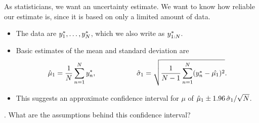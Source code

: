 \begin{frame}

As statisticians, we want an uncertainty estimate. We want to know how reliable our estimate is, since it is based on only a limited amount of data.

\begin{itemize}

\item The data are $y_1^*,\dots,y_N^*$, which we also write as $y_{1:N}^*$.

\item Basic estimates of the mean and standard deviation are 
\begin{equation}
\hat\mu_1= \frac{1}{N}\sum_{n=1}^Ny_n^*, \hspace{2cm}
\hat\sigma_1= \sqrt{\frac{1}{N-1}\sum_{n=1}^N(y_n^*-\hat{\mu_1})^2}.
\end{equation}


\item This suggests an approximate confidence interval for $\mu$ of $\hat\mu_1 \pm 1.96\, \hat\sigma_1/\sqrt{N}$.

\end{itemize}

\myquestion. What are the assumptions behind this confidence interval?

\answer{\vspace{2cm}}{}

\end{frame}

